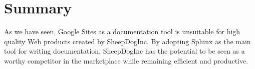 \documentclass[letterpaper]{report}
\begin{document}
\section*{Summary}

    As we have seen, Google Sites as a documentation tool is unsuitable for
    high quality Web products created by SheepDogInc. By adopting Sphinx as the
    main tool for writing documentation, SheepDogInc has the potential to be
    seen as a worthy competitor in the marketplace while remaining efficient
    and productive.
\end{document}
